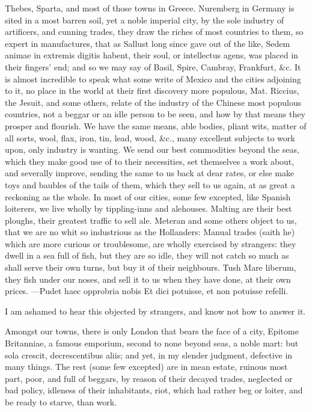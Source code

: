 {Thebes, Sparta, and most of those towns in Greece. Nuremberg in Germany
is sited in a most barren soil, yet a noble imperial city, by the sole
industry of artificers, and cunning trades, they draw the riches of
most countries to them, so expert in manufactures, that as Sallust long
since gave out of the like, Sedem animae in extremis digitis habent,
their soul, or intellectus agens, was placed in their fingers' end; and
so we may say of Basil, Spire, Cambray, Frankfurt, \&c. It is almost
incredible to speak what some write of Mexico and the cities adjoining
to it, no place in the world at their first discovery more populous,
Mat. Riccius, the Jesuit, and some others, relate of the industry
of the Chinese most populous countries, not a beggar or an idle person
to be seen, and how by that means they prosper and flourish. We have
the same means, able bodies, pliant wits, matter of all sorts, wool,
flax, iron, tin, lead, wood, \&c., many excellent subjects to work upon,
only industry is wanting. We send our best commodities beyond the seas,
which they make good use of to their necessities, set themselves a work
about, and severally improve, sending the same to us back at dear
rates, or else make toys and baubles of the tails of them, which they
sell to us again, at as great a reckoning as the whole. In most of our
cities, some few excepted, like Spanish loiterers, we live wholly
by tippling-inns and alehouses. Malting are their best ploughs, their
greatest traffic to sell ale. Meteran and some others object to
us, that we are no whit so industrious as the Hollanders: Manual trades
(saith he) which are more curious or troublesome, are wholly exercised
by strangers: they dwell in a sea full of fish, but they are so idle,
they will not catch so much as shall serve their own turns, but buy it
of their neighbours. Tush Mare liberum, they fish under our noses,
and sell it to us when they have done, at their own prices.
---Pudet haec opprobria nobis
Et dici potuisse, et non potuisse refelli.

I am ashamed to hear this objected by strangers, and know not how to
answer it.

Amongst our towns, there is only London that bears the face of a
city, Epitome Britanniae, a famous emporium, second to none beyond
seas, a noble mart: but sola crescit, decrescentibus aliis; and yet, in
my slender judgment, defective in many things. The rest (some few
excepted) are in mean estate, ruinous most part, poor, and full of
beggars, by reason of their decayed trades, neglected or bad policy,
idleness of their inhabitants, riot, which had rather beg or loiter,
and be ready to starve, than work.

}
